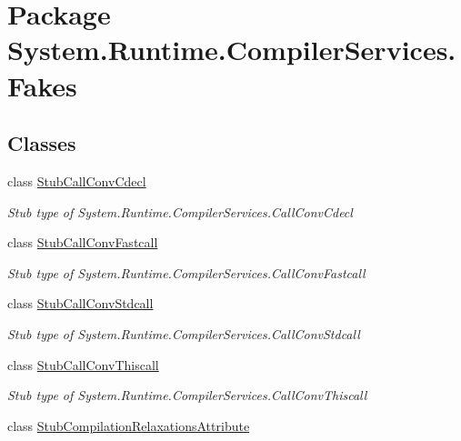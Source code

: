 \hypertarget{namespace_system_1_1_runtime_1_1_compiler_services_1_1_fakes}{\section{Package System.\-Runtime.\-Compiler\-Services.\-Fakes}
\label{namespace_system_1_1_runtime_1_1_compiler_services_1_1_fakes}
}
\subsection*{Classes}
\begin{DoxyCompactItemize}
\item 
class \hyperlink{class_system_1_1_runtime_1_1_compiler_services_1_1_fakes_1_1_stub_call_conv_cdecl}{Stub\-Call\-Conv\-Cdecl}
\begin{DoxyCompactList}\small\item\em Stub type of System.\-Runtime.\-Compiler\-Services.\-Call\-Conv\-Cdecl\end{DoxyCompactList}\item 
class \hyperlink{class_system_1_1_runtime_1_1_compiler_services_1_1_fakes_1_1_stub_call_conv_fastcall}{Stub\-Call\-Conv\-Fastcall}
\begin{DoxyCompactList}\small\item\em Stub type of System.\-Runtime.\-Compiler\-Services.\-Call\-Conv\-Fastcall\end{DoxyCompactList}\item 
class \hyperlink{class_system_1_1_runtime_1_1_compiler_services_1_1_fakes_1_1_stub_call_conv_stdcall}{Stub\-Call\-Conv\-Stdcall}
\begin{DoxyCompactList}\small\item\em Stub type of System.\-Runtime.\-Compiler\-Services.\-Call\-Conv\-Stdcall\end{DoxyCompactList}\item 
class \hyperlink{class_system_1_1_runtime_1_1_compiler_services_1_1_fakes_1_1_stub_call_conv_thiscall}{Stub\-Call\-Conv\-Thiscall}
\begin{DoxyCompactList}\small\item\em Stub type of System.\-Runtime.\-Compiler\-Services.\-Call\-Conv\-Thiscall\end{DoxyCompactList}\item 
class \hyperlink{class_system_1_1_runtime_1_1_compiler_services_1_1_fakes_1_1_stub_compilation_relaxations_attribute}{Stub\-Compilation\-Relaxations\-Attribute}

\end{DoxyCompactItemize}
